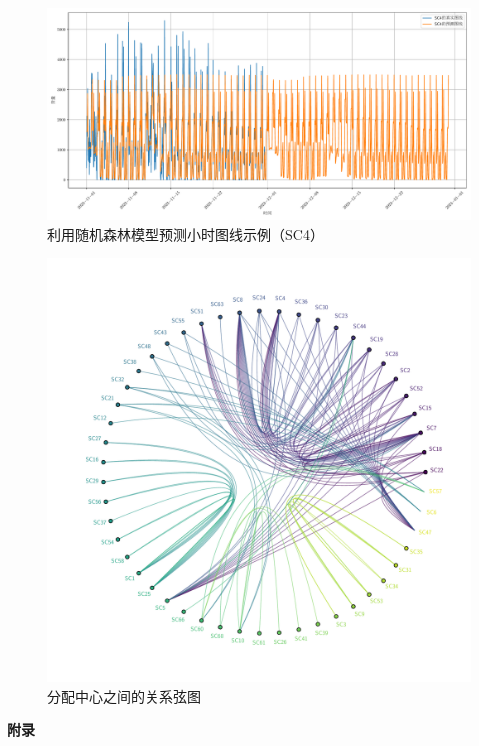 \documentclass[UTF8,a4paper,10 pt]{article}%
\begin{document}
\begin{figure}[!ht]
	\centering
	\includegraphics*[width=0.9\linewidth]{images/SC_4_2.pdf}
	\caption{利用随机森林模型预测小时图线示例（SC4）}
	\label{SC4_2}
\end{figure}

\begin{figure}[!ht]
	\centering
	\includegraphics*[width=0.8\linewidth]{images/xuantu.pdf}
	\caption{分配中心之间的关系弦图}
	\label{xt}
\end{figure}

\clearpage
\begin{center}
    \huge \bf 附录
\end{center}
\appendix
\end{document}
